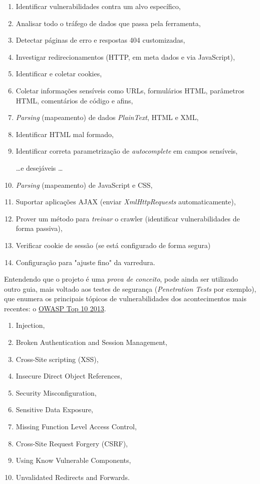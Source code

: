\documentclass[a4paper]{article}
\begin{document}
\begin{enumerate}

\item Identificar vulnerabilidades contra um alvo específico,
\item Analisar todo o tráfego de dados que passa pela ferramenta,
\item Detectar páginas de erro e respostas 404 customizadas,
\item Investigar redirecionamentos (HTTP, em meta dados e via JavaScript),
\item Identificar e coletar cookies,
\item Coletar informações sensíveis como URLs, formulários HTML, parâmetros HTML, comentários de código e afins,
\item \emph{Parsing} (mapeamento) de dados \emph{PlainText}, HTML e XML,
\item Identificar HTML mal formado,
\item Identificar correta parametrização de \emph{autocomplete} em campos sensíveis,

\dots e desejáveis \dots

\item \emph{Parsing} (mapeamento) de JavaScript e CSS,
\item Suportar aplicações AJAX (enviar \emph{XmlHttpRequests} automaticamente),
\item Prover um método para \emph{treinar} o crawler (identificar vulnerabilidades de forma passiva),
\item Verificar cookie de sessão (se está configurado de forma segura)
\item Configuração para "ajuste fino" da varredura.

\end{enumerate}

Entendendo que o projeto é uma \emph{prova de conceito}, pode ainda ser utilizado outro guia, mais voltado aos testes de segurança (\emph{Penetration Tests} por exemplo), que enumera os principais tópicos de vulnerabilidades dos acontecimentos mais recentes: o \href{http://www.owasp.org}{OWASP Top 10 2013}. \cite{lamport94}

\begin{enumerate}
\item Injection,
\item Broken Authentication and Session Management,
\item Cross-Site scripting (XSS),
\item Insecure Direct Object References,
\item Security Misconfiguration,
\item Sensitive Data Exposure,
\item Missing Function Level Access Control,
\item Cross-Site Request Forgery (CSRF),
\item Using Know Vulnerable Components,
\item Unvalidated Redirects and Forwards.
\end{enumerate}
\end{document}
